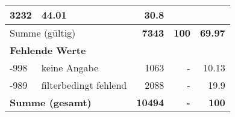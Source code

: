 \begin{longtable}{lXrrr}
       \num{3232} &
       \num[round-mode=places,round-precision=2]{44,01} &
         \num[round-mode=places,round-precision=2]{30,8} \\
     \midrule
     \multicolumn{2}{l}{Summe (gültig)} &
       \textbf{\num{7343}} &
     \textbf{100} &
       \textbf{\num[round-mode=places,round-precision=2]{69,97}} \\
     \multicolumn{5}{l}{\textbf{Fehlende Werte}}\\
       -998 &
       keine Angabe &
         \num{1063} &
        - &
         \num[round-mode=places,round-precision=2]{10,13} \\
       -989 &
       filterbedingt fehlend &
         \num{2088} &
        - &
         \num[round-mode=places,round-precision=2]{19,9} \\
     \midrule
     \multicolumn{2}{l}{\textbf{Summe (gesamt)}} &
          \textbf{\num{10494}} &
        \textbf{-} &
        \textbf{100} \\
     \bottomrule
     \end{longtable}
     
